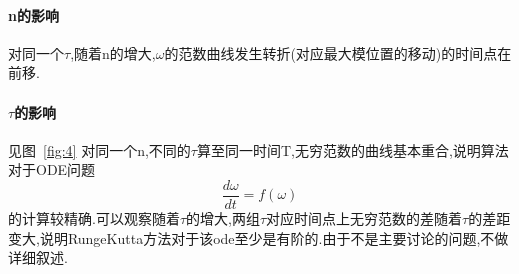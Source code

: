 \documentclass[UTF8]{ctexart}
\begin{document}
\begin{itemize}
\paragraph{n的影响}
对同一个$\tau$,随着n的增大,$\omega$的范数曲线发生转折(对应最大模位置的移动)的时间点在前移.

\paragraph{$\tau$的影响}
见图~\ref{fig:4} 对同一个n,不同的$\tau$算至同一时间T,无穷范数的曲线基本重合,说明算法对于ODE问题
$$\frac{d\omega}{dt}=f(\omega)$$
的计算较精确.可以观察随着$\tau$的增大,两组$\tau$对应时间点上无穷范数的差随着$\tau$的差距变大,说明RungeKutta方法对于该ode至少是有阶的.由于不是主要讨论的问题,不做详细叙述.


\end{itemize}
\end{document}
